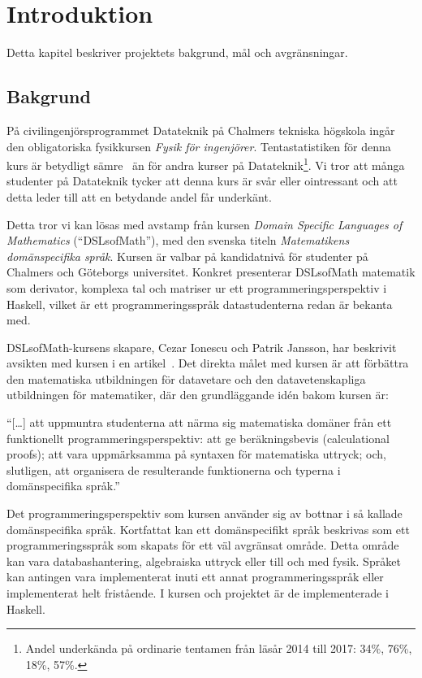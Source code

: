 
\chapter{Introduktion}

Detta kapitel beskriver projektets bakgrund, mål och avgränsningar.

\section{Bakgrund}

På civilingenjörsprogrammet Datateknik på Chalmers tekniska högskola ingår den
obligatoriska fysikkursen \textit{Fysik för ingenjörer}. Tentastatistiken för
denna kurs är betydligt sämre~\cite{tentastatistik} än för andra kurser på
Datateknik\footnote{Andel underkända på ordinarie tentamen från läsår 2014 till
2017: 34\%, 76\%, 18\%, 57\%.}. Vi tror att många studenter på
Datateknik tycker att denna kurs är svår eller ointressant och att detta leder
till att en betydande andel får underkänt.

Detta tror vi kan lösas med avstamp från kursen \textit{Domain
Specific Languages of Mathematics} (``DSLsofMath''), med den svenska titeln
\textit{Matematikens domänspecifika språk}. Kursen är valbar på kandidatnivå för studenter på Chalmers och Göteborgs universitet. Konkret
presenterar DSLsofMath matematik som derivator, komplexa tal och
matriser ur ett programmeringsperspektiv i Haskell, vilket är ett programmeringsspråk datastudenterna redan är bekanta med.

DSLsofMath-kursens skapare, Cezar Ionescu och Patrik Jansson, har beskrivit avsikten med kursen i en artikel~\cite{tfpie2015}. Det direkta målet med kursen är
att förbättra den matematiska utbildningen för datavetare och den
datavetenskapliga utbildningen för matematiker, där den grundläggande idén
bakom kursen är:

\begin{center} ``[\dots] att uppmuntra studenterna att närma sig matematiska
  domäner från ett funktionellt programmeringsperspektiv: att ge beräkningsbevis
  (calculational proofs); att vara uppmärksamma på syntaxen för matematiska
  uttryck; och, slutligen, att organisera de resulterande funktionerna och
typerna i domänspecifika språk.''~\cite{tfpie2015}
\end{center}

Det programmeringsperspektiv som kursen använder sig av bottnar i
så kallade domänspecifika språk. Kortfattat kan ett domänspecifikt språk
beskrivas som ett programmeringsspråk som skapats för ett väl avgränsat
område. Detta område kan vara databashantering, algebraiska uttryck eller till
och med fysik. Språket kan antingen vara implementerat inuti ett annat
programmeringsspråk eller implementerat helt fristående. I kursen och projektet
är de implementerade i Haskell.

